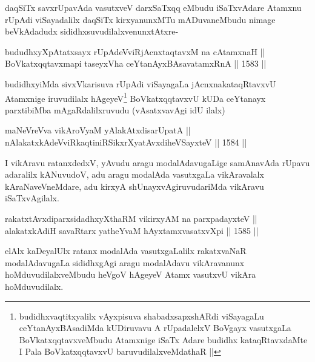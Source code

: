 \begin{artha}
daqSiTx savxrUpavAda vasutxveV darxSaTxqq eMbudu iSaTxvAdare Atamxnu rUpAdi viSayadalilx daqSiTx kirxyanunxMTu mADuvaneMbudu nimage beVkAdadudx sididhxsuvudilalxvenunxtAtxre-
\end{artha}

\begin{shl}
bududhxyXpAtatxsayx rUpAdeVviRjAcnxtaqtavxM na cA\s \s tamxnaH || \\
BoVkatxqqtavxmapi taseyxVha ceYtanAyxBAsavatamxRnA ||  1583 ||  
\end{shl}

\begin{artha}
budidhxyiMda sivxVkarisuva rUpAdi viSayagaLa jAcnxnakataqRtavxvU Atamxnige iruvudilalx hAgeyeV\footnote{budidhxvaqtitxyalilx vAyxpisuva shabadxsapxshARdi viSayagaLu ceYtanAyxBAsadiMda kUDiruvavu A rUpadalelxV BoVgayx vasutxgaLa BoVkatxqqtavxveMbudu Atamxnige iSaTx Adare budidhx kataqRtavxdaMte I Pala BoVkatxqqtavxvU baruvudilalxveMdathaR ||} BoVkatxqqtavxvU kUDa ceYtanayx parxtibiMba mAgaRdalilxruvudu (vAsatxvavAgi idU ilalx)
\end{artha}


\begin{shl}
maNeVreVva vikAroV\s yaM yA\s lakAtxdisarUpatA || \\
nAlakatxkAdeVviRkaqtiniRSikxrXyatAvxdiheVSayxteV ||  1584 ||  
\end{shl}

\begin{artha}
I vikAravu ratanxdedxV, yAvudu aragu modalAdavugaLige samAnavAda rUpavu adaralilx kANuvudoV, adu aragu modalAda vasutxgaLa vikAravalalx kAraNaveVneMdare, adu kirxyA shUnayxvAgiruvudariMda vikAravu iSaTxvAgilalx.
\end{artha}


\begin{shl}
rakatxtAvxdiparxsidadhxyXthaRM vikirxyAM na parxpadayxteV || \\
alakatxkAdiH savaRtarx yatheYvaM hAyxtamxvasatxvXpi ||  1585 ||  
\end{shl}

\begin{artha}
elAlx kaDeyalUlx ratanx modalAda vasutxgaLalilx rakatxvaNaR modalAdavugaLa sididhxgAgi aragu modalAdavu vikAravanunx hoMduvudilalxveMbudu heVgoV hAgeyeV Atamx vasutxvU vikAra hoMduvudilalx.
\end{artha}

